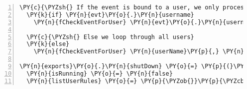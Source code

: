\begin{Verbatim}[fontsize=\scriptsize,commandchars=\\\{\},numbers=left,firstnumber=1,stepnumber=1]
  \PY{c}{\PYZsh{} If the event is bound to a user, we only process it for him}
  \PY{k}{if} \PY{n}{evt}\PY{o}{.}\PY{n}{username}
    \PY{n}{fCheckEventForUser} \PY{n}{evt}\PY{o}{.}\PY{n}{username}\PY{p}{,} \PY{n}{listUserRules}\PY{p}{[} \PY{n}{evt}\PY{o}{.}\PY{n}{username} \PY{p}{]}

  \PY{c}{\PYZsh{} Else we loop through all users}
  \PY{k}{else}
    \PY{n}{fCheckEventForUser} \PY{n}{userName}\PY{p}{,} \PY{n}{oUser} \PY{k}{for} \PY{n}{userName}\PY{p}{,} \PY{n}{oUser} \PY{n}{of} \PY{n}{listUserRules}

\PY{n}{exports}\PY{o}{.}\PY{n}{shutDown} \PY{o}{=} \PY{p}{(}\PY{p}{)} \PY{o}{\PYZhy{}}\PY{o}{\PYZgt{}}
  \PY{n}{isRunning} \PY{o}{=} \PY{n}{false}
  \PY{n}{listUserRules} \PY{o}{=} \PY{p}{\PYZob{}}\PY{p}{\PYZcb{}}
\end{Verbatim}













\clearpage
